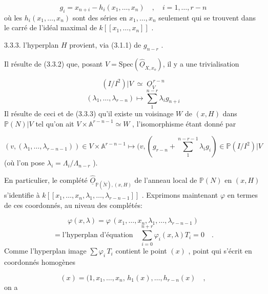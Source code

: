 \begin{equation*}
g_i = x_{n+i} - h_i(x_1,\dots,x_n) \quad , \quad i = 1,\dots,r-n
\end{equation*}
où les $h_i(x_1,\dots,x_n)$ sont des séries en $x_1,\dots,x_n$ seulement qui se trouvent dans le carré de l'idéal maximal de $k[[x_1,\dots,x_n]]$ .

3.3.3.  l'hyperplan $H$ provient, via (3.1.1) de $g_{n-r}$ .

Il résulte de (3.3.2) que, posant $V = \mathrm{Spec}(\hat{\underline{O}}_{X,x_o})$, il y a une trivialisation

\begin{equation*}
(I/I^2)|V \;\simeq\; \underline{O}_V^{\,r-n}
\end{equation*}
\begin{equation}\tag{3.3.4}
(\lambda_1,\dots,\lambda_{r-n}) \longmapsto \sum_1^{n-r} \lambda_i g_{n+i}
\end{equation}
Il résulte de ceci et de (3.3.3) qu'il existe un voisinage $W$ de $(x, H)$
dans $\mathbb{P}(N)|V$ tel qu'on ait $V \times \mathbb{A}^{r-n-1} \simeq W$ , l'isomorphisme étant donné par

\begin{equation}\tag{3.3.5}
(v,(\lambda_1,\dots,\lambda_{r-n-1})) \in V\times\mathbb{A}^{r-n-1} \longmapsto (v,(g_{r-n}+ \sum_1^{n-r-1} \lambda_i g_i) \in \mathbb{P}(I/I^2)|V
\end{equation}
(où l'on pose $\lambda_i = \Lambda_i / \Lambda_{n-r}$ ).

En particulier, le complété $\hat{\underline{O}}_{\mathbb{P}(\check{N}),(x,H)}$ de l'anneau local de $\mathbb{P}(N)$ en $(x, H)$ s'identifie à $k[[x_1,\dots,x_n,\lambda_1,\dots,\lambda_{r-n-1}]]$ . Exprimons maintenant $\varphi$ en termes de ces coordonnés, au niveau des complétés:

\begin{equation}\tag{3.3.6}
\varphi(x,\lambda) = \varphi\, (x_1,\dots,x_n,\lambda_1,\dots,\lambda_{r-n-1})
\end{equation}
\begin{equation*}
= \mbox{l'hyperplan d'équation} \quad \sum_{i=0}^{n+r} \varphi_i(x,\lambda)T_i = 0 \quad .
\end{equation*}
Comme l'hyperplan image $\sum \varphi_i\, T_i$ contient le point $(x)$ , point qui s'écrit en coordonnés homogènes

\begin{equation}\tag{3.3.7}
(x) = (1,x_1,\dots,x_n,\, h_1(x),\dots,h_{r-n}(x) \quad ,
\end{equation}
on a

